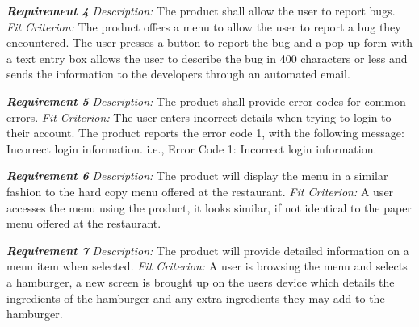 \documentclass[12pt, titlepage]{article}
\begin{document}
\textbf{\textit{Requirement 4}}\newline
\textit{Description:}\newline
The product shall allow the user to report bugs. \newline\newline
\textit{Fit Criterion:}\newline 
The product offers a menu to allow the user to report a bug they encountered. The user presses a button to report the bug and a pop-up form with a text entry box allows the user to describe the bug in 400 characters or less and sends the information to the developers through an automated email.
\newline

\textbf{\textit{Requirement 5}}\newline
\textit{Description:}\newline
The product shall provide error codes for common errors. \newline\newline
\textit{Fit Criterion:}\newline 
The user enters incorrect details when trying to login to their account. The product reports the error code 1, with the following message: Incorrect login information. i.e., Error Code 1: Incorrect login information.
\newline

\textbf{\textit{Requirement 6}}\newline
\textit{Description:}\newline
The product will display the menu in a similar fashion to the hard copy menu offered at the restaurant. \newline\newline
\textit{Fit Criterion:}\newline 
A user accesses the menu using the product, it looks similar, if not identical to the paper menu offered at the restaurant.
\newline

\textbf{\textit{Requirement 7}}\newline
\textit{Description:}\newline
The product will provide detailed information on a menu item when selected. \newline\newline
\textit{Fit Criterion:}\newline 
A user is browsing the menu and selects a hamburger, a new screen is brought up on the users device which details the ingredients of the hamburger and any extra ingredients they may add to the hamburger.
\newline
\end{document}
